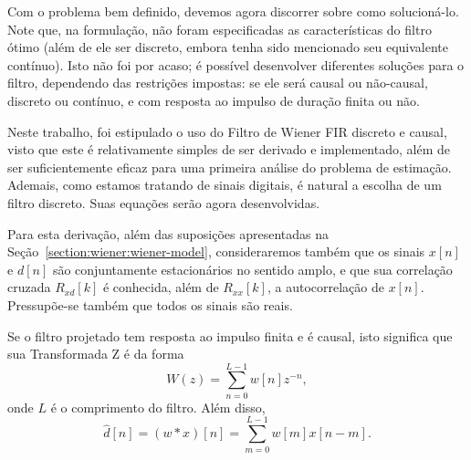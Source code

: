 Com o problema bem definido, devemos agora discorrer sobre como solucioná-lo. Note que,
na formulação, não foram especificadas as características do filtro ótimo (além de ele
ser discreto, embora tenha sido mencionado seu equivalente contínuo). Isto não foi por
acaso; é possível desenvolver diferentes soluções para o filtro, dependendo das
restrições impostas: se ele será causal ou não-causal, discreto ou contínuo, e com
resposta ao impulso de duração finita ou não.

Neste trabalho, foi estipulado o uso do Filtro de Wiener FIR discreto e causal, visto
que este é relativamente simples de ser derivado e implementado, além de ser
suficientemente eficaz para uma primeira análise do problema de estimação. Ademais,
como estamos tratando de sinais digitais, é natural a escolha de um filtro discreto.
Suas equações serão agora desenvolvidas.

Para esta derivação, além das suposições apresentadas na
Seção~\ref{section:wiener:wiener-model}, consideraremos também que os sinais $x[n]$ e
$d[n]$ são conjuntamente estacionários no sentido amplo, e que sua correlação cruzada
$R_{xd}[k]$ é
conhecida, além de $R_{xx}[k]$, a autocorrelação de $x[n]$. Pressupõe-se também que
todos os sinais são reais.

Se o filtro projetado tem resposta ao impulso finita e é causal, isto significa que sua
Transformada Z é da forma
\begin{equation}
	W(z) = \sum_{n=0}^{L-1} w[n] z^{-n},
\end{equation}
onde $L$ é o comprimento do filtro. Além disso,
\begin{equation}
	\hat{d}[n] = (w * x)[n] = \sum_{m = 0}^{L - 1} w[m] x[n - m].
	\label{eq:wf:dhat-conv}
\end{equation}

